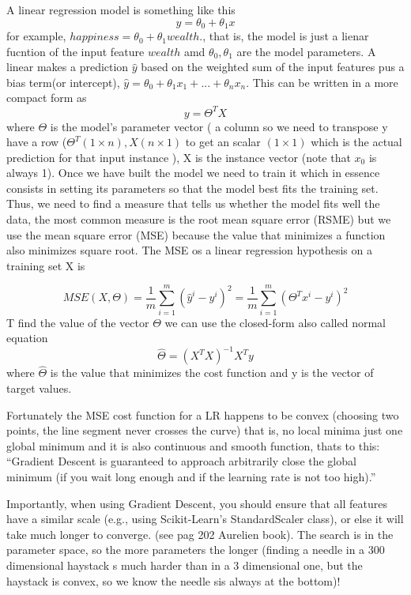 \documentclass[11pt]{article}
\begin{document}
A linear regression model is something like this
\begin{equation}
y = \theta_0 + \theta_{1}x
\end{equation}
for example, $happiness = \theta_0 + \theta_1 wealth$., that is, the model is just a lienar fucntion of the input feature $wealth$ amd $\theta_0, \theta_{1}$ are the model parameters. A linear makes a prediction $\hat{y}$ based on the weighted sum of the input features pus a bias term(or intercept), $\hat{y} = \theta_0 + \theta_1 x_1 + ...+ \theta_n x_n$. This can be written in a more compact form as
\begin{equation}
y = \Theta^{T} X 
\end{equation}
where $\Theta$ is the model's parameter vector ( a column so we need to transpose y have a row ($\Theta^{T} (1 \times n), X (n \times 1)$ to get an scalar $(1 \times 1)$ which is the actual prediction for that input instance ), X is the instance vector (note that $x_0$ is always 1).
Once we have built the model we need to train it which in essence consists in setting its parameters so that the model best fits the training set. Thus, we need to find a measure that tells us whether the model fits well the data, the most common measure is the root mean square error (RSME) but we use the mean square error (MSE) because the value that minimizes a function also minimizes square root.
The MSE os a linear regression hypothesis on a training set X is

\begin{equation}
MSE(X,\Theta) = \frac{1}{m} \sum_{i=1}^{m}(\hat{y}^{i} - y^{i})^2 = \frac{1}{m} \sum_{i=1}^{m}(\Theta^Tx^{i} - y^{i})^2
\end{equation}
T find the value of the vector $\Theta$ we can use the closed-form also called normal equation
\begin{equation}
\hat{\Theta} = (X^{T}X)^{-1}X^{T}y
\end{equation}
where $\hat{\Theta}$ is the value that minimizes the cost function and y is the vector of target values.

Fortunately the MSE cost function for a LR happens to be convex (choosing two points, the line segment never crosses the curve) that is, no local minima just one global minimum and it is also continuous and smooth function, thats to this: “Gradient Descent is guaranteed to approach arbitrarily close the global minimum (if you wait long enough and if the learning rate is not too high).”

Importantly, when using Gradient Descent, you should ensure that all features have a similar scale (e.g., using Scikit-Learn’s StandardScaler class), or else it will take much longer to converge. (see pag 202 Aurelien book). The search is in the parameter space, so the more parameters the longer (finding a needle in a 300 dimensional haystack s much harder than in a 3 dimensional one, but the haystack is convex, so we know the needle sis always at the bottom)!
\end{document}
